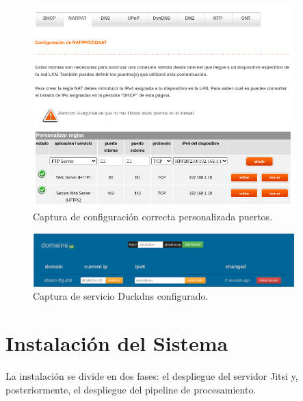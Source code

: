 \begin{figure}[H]
    \centering
    \includegraphics[width=0.9\textwidth]{img/routerconfig.png}
    \caption{Captura de configuración correcta personalizada puertos.}
    \label{fig:puertos_confi_anexoe}
\end{figure}
\begin{figure}[H]
    \centering
    \includegraphics[width=0.9\textwidth]{img/duckdns.png}
    \caption{Captura de servicio Duckdns configurado.}
    \label{fig:duckdns_anexoe}
\end{figure}

\section{Instalación del Sistema}
\label{sec:manual_instalacion}
La instalación se divide en dos fases: el despliegue del servidor Jitsi y, posteriormente, el despliegue del pipeline de procesamiento.


